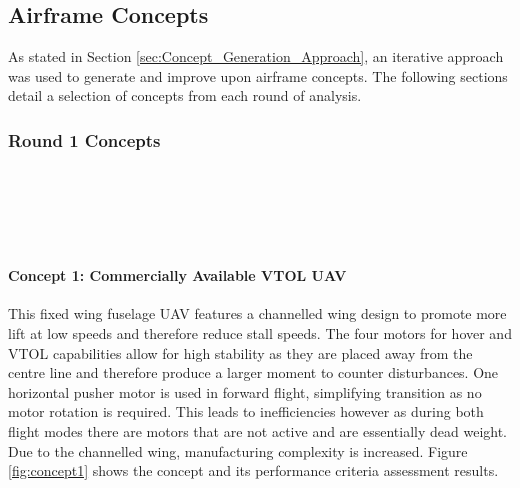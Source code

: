 \subsection{Airframe Concepts}

As stated in Section \ref{sec:Concept_Generation_Approach}, an iterative approach was used to generate and improve upon airframe concepts. The following sections detail a selection of concepts from each round of analysis.

\subsubsection{Round 1 Concepts}
\\
\\
\\
\\

\paragraph{Concept 1: Commercially Available VTOL UAV}
This fixed wing fuselage UAV features a channelled wing design to promote more lift at low speeds and therefore reduce stall speeds. The four motors for hover and VTOL capabilities allow for high stability as they are placed away from the centre line and therefore produce a larger moment to counter disturbances. One horizontal pusher motor is used in forward flight, simplifying transition as no motor rotation is required. This leads to inefficiencies however as during both flight modes there are motors that are not active and are essentially dead weight. Due to the channelled wing, manufacturing complexity is increased. Figure \ref{fig:concept1} shows the concept and its performance criteria assessment results. 



